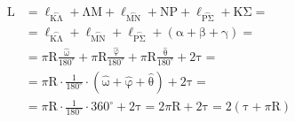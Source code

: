 \begin{alist}
    \begin{align*}
        \mathrm{L} &= \ell_{\overset{\frown}{\mathrm{K\Lambda}}} + \mathrm{\Lambda M} + \ell_{\overset{\frown}{\mathrm{MN}}} + \mathrm{NP} + \ell_{\overset{\frown}{\mathrm{P\Sigma}}} + \mathrm{K\Sigma} = \\
        &= \ell_{\overset{\frown}{\mathrm{K\Lambda}}} + \ell_{\overset{\frown}{\mathrm{MN}}} + \ell_{\overset{\frown}{\mathrm{P\Sigma}}} + (\mathrm{\alpha} + \mathrm{\beta} + \mathrm{\gamma}) = \\
        &= \pi \mathrm{R} \frac{\mathrm{\widehat{\omega}}}{180^{\circ}} + \pi \mathrm{R} \frac{\mathrm{\widehat{\varphi}}}{180^{\circ}} + \pi \mathrm{R} \frac{\mathrm{\widehat{\theta}}}{180^{\circ}} + 2\mathrm{\tau} = \\
        &= \pi \mathrm{R} \cdot \frac{1}{180^{\circ}} \cdot (\mathrm{\widehat{\omega}} + \mathrm{\widehat{\varphi}} + \mathrm{\widehat{\theta}}) + 2\mathrm{\tau} = \\
        &= \pi \mathrm{R} \cdot \frac{1}{180^{\circ}} \cdot 360^{\circ} + 2\mathrm{\tau} = 2\pi \mathrm{R} + 2\mathrm{\tau} = 2(\mathrm{\tau} + \pi \mathrm{R})
    \end{align*}
\end{alist}